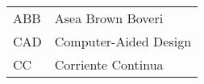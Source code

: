 \chapter*{\notationname}
\pagestyle{especial}
\chaptermark{\notationname}
{}
\begin{longtable}{p{3cm}p{8.5cm}}

ABB & Asea Brown Boveri \\
CAD & Computer-Aided Design \\
CC & Corriente Continua \\


\end{longtable}
